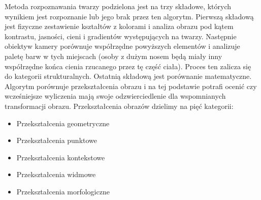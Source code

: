 \documentclass{article}
\begin{document}
	\par
	Metoda rozpoznawania twarzy podzielona jest na trzy składowe, których wynikiem jest rozpoznanie lub jego brak przez ten algorytm. Pierwszą składową jest fizyczne zestawienie kształtów z kolorami i analiza obrazu pod kątem kontrastu, jasności, cieni i gradientów występujących na twarzy. Następnie obiektyw kamery porównuje współrzędne powyższych elementów i analizuje paletę barw w tych miejscach (osoby z dużym nosem będą miały inny współrzędne końca cienia rzucanego przez tę część ciała). Proces ten zalicza się do kategorii strukturalnych. Ostatnią składową jest porównanie matematyczne. Algorytm porównuje przekształcenia obrazu i na tej podstawie potrafi ocenić czy wcześniejsze wyliczenia mają swoje odzwierciedlenie dla wspomnianych transformacji obrazu. Przekształcenia obrazów dzielimy na pięć kategorii:
	\begin{itemize}
		\item Przekształcenia geometryczne
		\item Przekształcenia punktowe
		\item Przekształcenia kontekstowe
		\item Przekształcenia widmowe
		\item Przekształcenia morfologiczne	
	\end{itemize}
\end{document}
